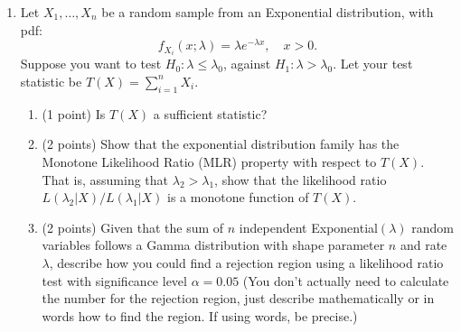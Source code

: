 \documentclass[10pt,twoside]{article}\usepackage[]{graphicx}\usepackage[dvipsnames,svgnames,table]{xcolor}
\begin{document}
\begin{enumerate}
  \begin{enumerate}
    \item (2 points) Calculate or estimate the Type~I error rate $(\alpha)$ of this test. Does the test control the Type~I error rate at the traditional $\alpha = 0.05$ level? You can use software to approximate the Poisson probabilities.
    \item (2 points) In many contexts, controlling the Type~I error rate is standard because false positives are ``more consequential" than false negatives. Conceptually, why does controlling the Type~I error rate make very little sense for this problem?
    \item (3 points) Consider redesigning this test. Instead of rejecting if $Y > 30$, pick a value $c$ such that we reject when $Y > c$. Rather than picking $c$ to strictly control the Type I error rate (as it doesn't make much sense to do so for this problem), propose an alternative statistical criterion for picking $c$. State your criterion, briefly explain why it is appropriate for this scenario, and then use it to find an optimal integer value for $c$.
  \end{enumerate}

\item Let $X_1, \ldots, X_n$ be a random sample from an Exponential distribution, with pdf:
$$
f_{X_i}(x; \lambda) = \lambda e^{-\lambda x},\quad x > 0.
$$
Suppose you want to test $H_0: \lambda \leq \lambda_0$, against $H_1: \lambda > \lambda_0$. Let your test statistic be $T(X) = \sum_{i = 1}^n X_i$.

\begin{enumerate}
  \item (1 point) Is $T(X)$ a sufficient statistic?
  \item (2 points) Show that the exponential distribution family has the Monotone Likelihood Ratio (MLR) property with respect to $T(X)$. That is, assuming that $\lambda_2 > \lambda_1$, show that the likelihood ratio $L(\lambda_2|X) / L(\lambda_1|X)$ is a monotone function of $T(X)$.
  \item (2 points) Given that the sum of $n$ independent Exponential$(\lambda)$ random variables follows a Gamma distribution with shape parameter $n$ and rate $\lambda$, describe how you could find a rejection region using a likelihood ratio test with significance level $\alpha = 0.05$ (You don't actually need to calculate the number for the rejection region, just describe mathematically or in words how to find the region. If using words, be precise.)
\end{enumerate}

\end{enumerate}
\end{document}
